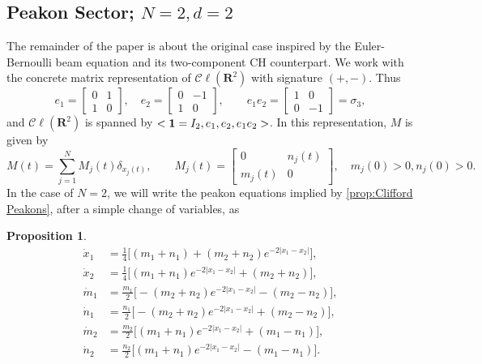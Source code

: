 \documentclass[10pt,a4paper]{article}
\numberwithin{equation}{section}
\theoremstyle{plain}
\theoremstyle{definition}
\newtheorem{proposition}[proposition]{Proposition}
\newcommand{\R}{\mathbf{R}}
\newcommand\Cl{\mathcal{C}\ell}
\newcommand{\abs}[1]{\left\lvert #1 \right\rvert}
\newcommand{\bo}{{\bf 1}}
\begin{document}
\subsection{Peakon Sector; $N=2, d=2$} 
The remainder of the paper is about the original case inspired by the Euler-Bernoulli beam equation and its two-component CH counterpart.  
We work with the concrete matrix representation of $\Cl (\R^2)$ with signature $(+,-)$.  
Thus 
\begin{equation} 
e_1=\begin{bmatrix} 0&1\\1&0 \end{bmatrix}, \quad e_2=\begin{bmatrix} 0&-1\\1&0 \end{bmatrix}, \qquad 
e_1e_2=\begin{bmatrix} 1&0\\0&-1 \end{bmatrix}=\sigma_3, 
\end{equation} 
and $\Cl(\R^2)$ is spanned by $<\bo=I_2, e_1, e_2, e_1e_2>$.  
In this representation, $M$ is given by 
\begin{equation} 
M(t)=\sum_{j=1}^N M_j(t) \delta_{x_j(t)}, \qquad M_j(t)=\begin{bmatrix} 0&n_j(t)\\m_j(t)&0 \end{bmatrix} 
 , \quad m_j(0)>0, n_j(0)>0.  
\end{equation} 
In the case of $N=2$, we will write the peakon equations  implied by \autoref{prop:Clifford Peakons}, after a simple change of variables,  as 
\begin{proposition} \label{prop:twopeakons}
\begin{align} 
\dot x_1&=\frac14\big[(m_1+n_1)+(m_2+n_2) e^{-2\abs{x_1-x_2}}\big], \label{eq:x1}\\
\dot x_2&=\frac14\big[(m_1+n_1)e^{-2\abs{x_1-x_2}}+(m_2+n_2) \big], \label{eq:x2}\\
\dot m_1&=\frac{m_1}{2}\big[ -(m_2+n_2)e^{-2\abs{x_1-x_2}}-(m_2-n_2) \big], \label{eq:m1}\\
\dot n_1&=\frac{n_1}{2}\big[ -(m_2+n_2)e^{-2\abs{x_1-x_2}}+(m_2-n_2) \big], \label{eq:n1}\\
\dot m_2&=\frac{m_2}{2}\big[ (m_1+n_1)e^{-2\abs{x_1-x_2}}+(m_1-n_1) \big],  \label{eq:m2}\\
\dot n_2&=\frac{n_2}{2} \big[ (m_1+n_1)e^{-2\abs{x_1-x_2}}-(m_1-n_1)\big]. \label{eq:n2}
  \end{align} 
  \end{proposition} 
\end{document}
